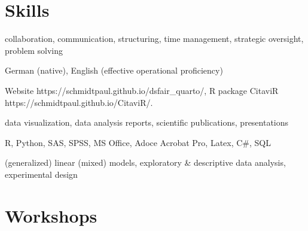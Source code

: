 \documentclass[11pt,a4paper,]{awesome-cv}
\begin{document}
\hypertarget{skills}{%
\section{Skills}\label{skills}}

\begin{cvskills} 
{collaboration, communication, structuring, time management, strategic oversight, problem solving } 

{German (native), English (effective operational proficiency) } 

{Website https://schmidtpaul.github.io/dsfair\_quarto/, R package CitaviR https://schmidtpaul.github.io/CitaviR/. } 

{data visualization, data analysis reports, scientific publications, presentations } 

{R, Python, SAS, SPSS, MS Office, Adoce Acrobat Pro, Latex, C\#, SQL } 

{(generalized) linear (mixed) models, exploratory \& descriptive data analysis, experimental design } 
\end{cvskills}

\hypertarget{workshops}{%
\section{Workshops}\label{workshops}}
\end{document}
